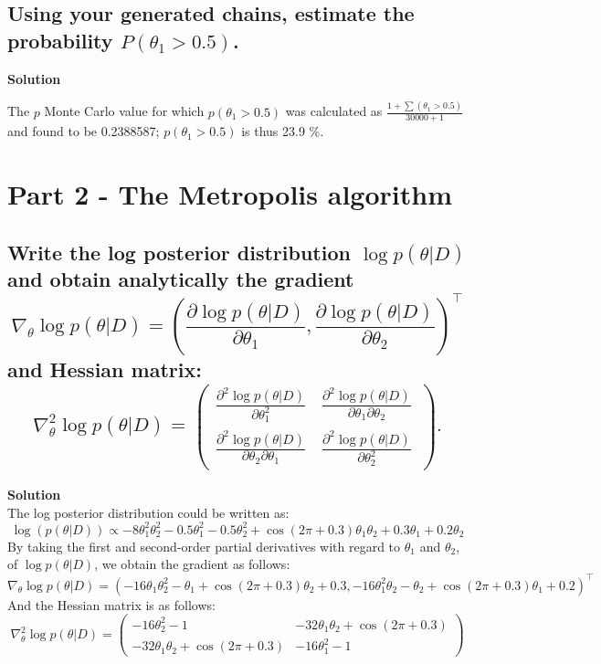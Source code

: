\documentclass[12pt]{article}
\begin{document}
\subsection{Using your generated chains, estimate the probability $P(\theta_1 > 0.5)$.}
\textbf{Solution}

The $p$ Monte Carlo value for which $p(\theta_1 > 0.5)$ was calculated as  $\frac{1 + \sum (\theta_1 > 0.5)}{30000 + 1}$ and found to be 0.2388587; $p(\theta_1 > 0.5)$ is thus 23.9 \%.


\section{Part 2 - The Metropolis algorithm}
\subsection{Write the log posterior distribution \( \log p(\theta|D) \) and obtain analytically the gradient
\[\nabla_\theta \log p(\theta|D) = \left( \frac{\partial \log p(\theta|D)}{\partial \theta_1}, \frac{\partial \log p(\theta|D)}{\partial \theta_2} \right)^\top \]
and Hessian matrix:
\[\nabla^2_\theta \log p(\theta|D) = 
\begin{pmatrix}
\frac{\partial^2 \log p(\theta|D)}{\partial \theta_1^2} & \frac{\partial^2 \log p(\theta|D)}{\partial \theta_1 \partial \theta_2} \\
\frac{\partial^2 \log p(\theta|D)}{\partial \theta_2 \partial \theta_1} & \frac{\partial^2 \log p(\theta|D)}{\partial \theta_2^2} 
\end{pmatrix}.\]}
\textbf{Solution}\\
The log posterior distribution could be written as:
\[
\log(p(\theta|D)) \propto -8\theta_1^2\theta_2^2 - 0.5\theta_1^2 - 0.5\theta_2^2 + \cos(2\pi + 0.3)\theta_1\theta_2 + 0.3\theta_1 + 0.2\theta_2
\]
By taking the first and second-order partial derivatives with regard to \(\theta_1\) and \(\theta_2\), of \(\log p(\theta|D)\),
we obtain the gradient as follows:
\[
\nabla_\theta \log p(\theta|D) = \left( -16\theta_1\theta_2^2 - \theta_1 + \cos(2\pi + 0.3)\theta_2 + 0.3, -16\theta_1^2\theta_2 - \theta_2 + \cos(2\pi + 0.3)\theta_1 + 0.2 \right)^\top
\]
And the Hessian matrix is as follows:
\[
\nabla^2_\theta \log p(\theta|D) = 
\begin{pmatrix}
-16\theta_2^2 - 1 & -32\theta_1\theta_2 + \cos(2\pi + 0.3) \\
-32\theta_1\theta_2 + \cos(2\pi + 0.3) & -16\theta_1^2 - 1
\end{pmatrix}
\]
\end{document}
